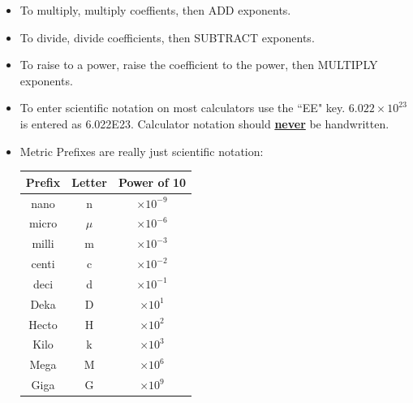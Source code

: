 \documentclass[letterpaper, 12pt]{article}
\begin{document}
\begin{enumerate}
\begin{itemize}
	\item To multiply, multiply coeffients, then ADD exponents.
	\item To divide, divide coefficients, then SUBTRACT exponents.
	\item To raise to a power, raise the coefficient to the power, then MULTIPLY exponents.
	\item To enter scientific notation on most calculators use the ``EE" key. $6.022 \times 10^{23}$ is entered as 6.022\scriptsize E\normalsize23.  Calculator notation should \underline{\textbf{never}} be handwritten. 
	\item Metric Prefixes are really just scientific notation:
	\begin{center}
	\begin{tabular}{|c|c|c|}
		\hline
		Prefix & Letter & Power of 10 \\
		\hline
		nano & n &  $ \times 10^{-9}$ \\
		\hline
		micro & $\mu$ &  $ \times 10^{-6}$ \\
		\hline
		milli & m & $ \times 10^{-3}$ \\
		\hline
		centi & c & $ \times 10^{-2}$ \\
		\hline
		deci & d & $ \times 10^{-1}$ \\
		\hline
		Deka & D & $ \times 10^{1}$ \\
		\hline
		Hecto & H & $ \times 10^{2}$ \\
		\hline
		Kilo & k & $ \times 10^{3}$ \\
		\hline
		Mega & M & $ \times 10^{6}$ \\
		\hline
		Giga & G & $ \times 10^{9}$ \\
		\hline
		
	\end{tabular}	
	\end{center}
	

	\end{itemize}
	
	\pagebreak
	

\end{enumerate}
\end{document}

